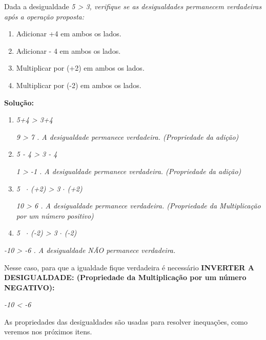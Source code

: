 \begin{texemplo}
    Dada a desigualdade \textit{5 > 3, verifique se as desigualdades permanecem verdadeiras após a operação proposta:}

\begin{enumerate}
	\item Adicionar +4 em ambos os lados.

	\item Adicionar - 4  em ambos os lados.

	\item Multiplicar por (+2) em ambos os lados.

	\item Multiplicar por (-2) em ambos os lados.
\end{enumerate}


\textbf{Solução: }

\begin{enumerate}
	\item \textit{5+4 > 3+4}

\textit{9 > 7 . A desigualdade permanece verdadeira. (Propriedade da adição)}

	\item \textit{5 - 4 > 3 - 4}

\textit{1 > -1 . A desigualdade permanece verdadeira. (Propriedade da adição)}

	\item \textit{5~ $ \cdot $  (+2)  > 3 $ \cdot $  (+2)}

\textit{10 > 6 . A desigualdade permanece verdadeira. (Propriedade da Multiplicação por um número positivo)}

	\item \textit{5~ $ \cdot $  (-2)  > 3 $ \cdot $  (-2)}
\end{enumerate}

\textit{-10 > -6 . A desigualdade NÃO permanece verdadeira.}

Nesse caso, para que a igualdade fique verdadeira é necessário \textbf{INVERTER A DESIGUALDADE: (Propriedade da Multiplicação por um número NEGATIVO):}

\textit{-10 < -6 \qedsymbol{}}
\end{texemplo}

As propriedades das desigualdades são usadas para resolver inequações, como veremos nos próximos itens.

